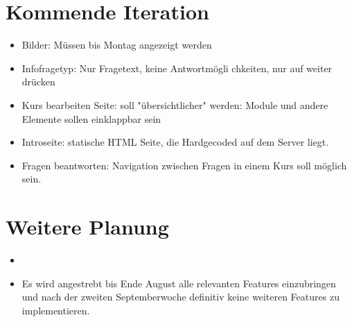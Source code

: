 \documentclass[colorback, accentcolor=tud1c, paper=a4]{tudexercise}
\begin{document}
\begin{multicols}{2}
\section*{Kommende Iteration}
\begin{itemize}
	\item Bilder: Müssen bis Montag angezeigt werden
	\item Infofragetyp: Nur Fragetext, keine Antwortmögli chkeiten, nur auf weiter drücken
	\item Kurs bearbeiten Seite: soll "übersichtlicher" werden: Module und andere Elemente sollen einklappbar sein
	\item Introseite: statische HTML Seite, die Hardgecoded auf dem Server liegt.
	\item Fragen beantworten: Navigation zwischen Fragen in einem Kurs soll möglich sein.

\end{itemize}

\section*{Weitere Planung}
\begin{itemize}
	\item 
	\item Es wird angestrebt bis Ende August alle relevanten Features einzubringen und nach der zweiten Septemberwoche definitiv keine weiteren Features zu implementieren.
\end{itemize}

\end{multicols}
\end{document}
